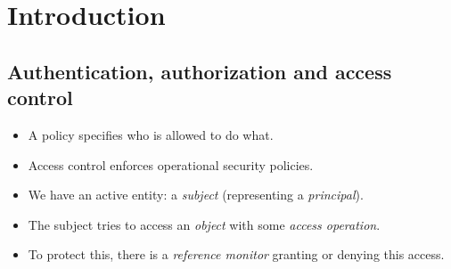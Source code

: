 \mode*




\section{Introduction}

\subsection{Authentication, authorization and access control}

\begin{frame}
  \begin{itemize}
    \item A policy specifies who is allowed to do what.

    \item Access control enforces operational security policies.
  \end{itemize}
\end{frame}

\begin{frame}
  \begin{definition}
    \begin{itemize}
      \item We have an active entity: a \emph{subject} (representing 
        a \emph{principal}).

      \item The subject tries to access an \emph{object} with some \emph{access 
          operation}.

      \item To protect this, there is a \emph{reference monitor} granting or 
        denying this access.
    \end{itemize}
  \end{definition}
\end{frame}

